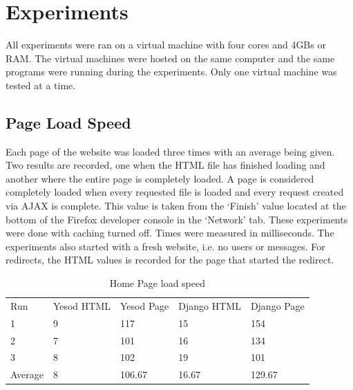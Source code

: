 \chapter{Experiments}
\label{app:Experiments}

All experiments were ran on a virtual machine with four cores and 4GBs
or RAM. The virtual machines were hosted on the same computer and the
same programs were running during the experiments. Only one virtual
machine was tested at a time.

\section{Page Load Speed}
\label{sec:pageLoadSpeeds}

Each page of the website was loaded three times with an average being
given. Two results are recorded, one when the HTML file has finished
loading and another where the entire page is completely loaded.
A page is considered completely loaded when every requested
file is loaded and every request created via AJAX is complete. This
value is taken from the `Finish' value located at the bottom of
the Firefox developer console in the `Network' tab. These
experiments were done with caching turned off. Times were measured
in milliseconds. The experiments also started with a fresh website,
i.e. no users or messages. For redirects, the HTML values is recorded
for the page that started the redirect.

\begin{table}[H]
    \caption{Home Page load speed}
    \begin{center}
        \begin{tabular}{ | l | l | l | l | l |}
            \hline
            Run & Yesod HTML & Yesod Page & Django HTML & Django Page \\
            1 & 9 & 117 & 15 & 154 \\
            2 & 7 & 101 & 16 & 134 \\
            3 & 8 & 102 & 19 & 101 \\
            Average & 8 & 106.67 & 16.67 & 129.67 \\
            \hline
        \end{tabular}
    \end{center}
    \label{tab:pageLoadSpeeds}
\end{table}

